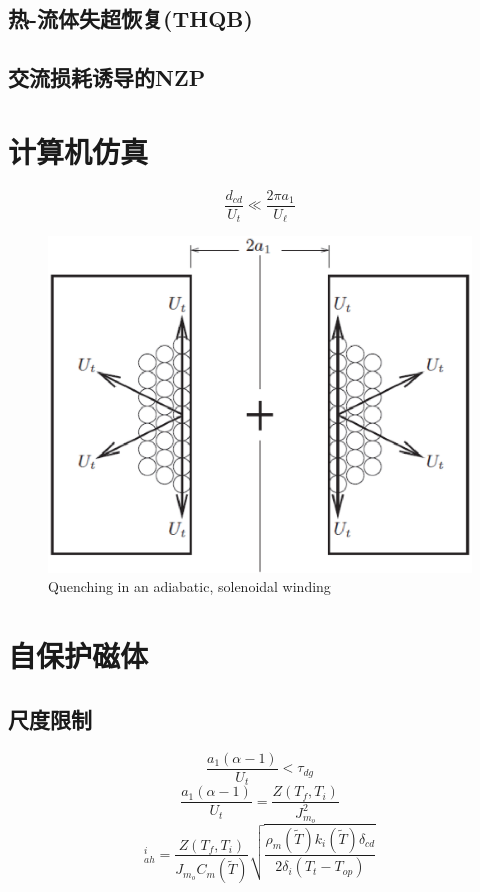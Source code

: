 \subsection{热-流体失超恢复(THQB)}

\subsection{交流损耗诱导的NZP}

\section{计算机仿真}
\begin{equation}%
\frac{d_{cd}}{U_t}\ll\frac{2\pi a_1}{U_\ell}
\end{equation}


\begin{figure}
	\centering
	\includegraphics[scale=0.6]{chpt8/figs/fig8.12.eps}
	\caption{Quenching in an adiabatic, solenoidal winding}
\end{figure}

\section{自保护磁体}

\subsection{尺度限制}

\begin{equation}%
\frac{a_1(\alpha-1)}{U_t}<\tau_{dg}
\end{equation}
\begin{equation}%
\frac{a_1(\alpha-1)}{U_t}=\frac{Z(T_f,T_i)}{J_{m_o}^{2}}
\end{equation}
\begin{equation}%
[a_1(\alpha-1)]_{ah}^{i}=\frac{Z(T_f,T_i)}{J_{m_o}C_m(\tilde{T})}\sqrt{\frac{\rho_m(\tilde{T})k_i(\tilde{T})\delta_{cd}}{2\delta_i(T_t-T_{op})}}
\end{equation}


